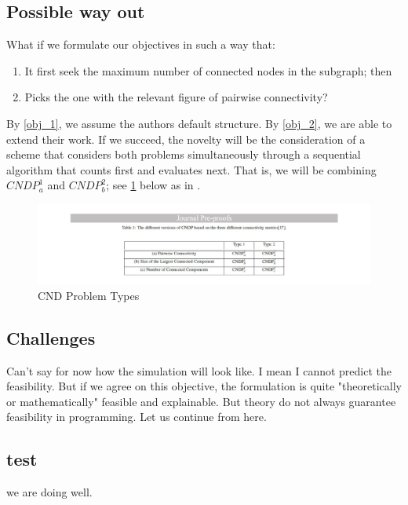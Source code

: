 \subsection{Possible way out}
What if we formulate our objectives in such a way that:
\begin{enumerate}
    \item It first seek the maximum number of connected nodes in the subgraph; then \label{obj_1}
    \item Picks the one with the relevant figure of pairwise connectivity? \label{obj_2}
\end{enumerate}
By \ref{obj_1}, we assume the authors default structure. By \ref{obj_2}, we are able to extend their work.
If we succeed, the novelty will be the consideration of a scheme that considers both problems simultaneously through a sequential algorithm that counts first and evaluates next. That is, we will be combining $CNDP_a^1$ and $CNDP_b^2$; see \ref{fig:cdnp} below as in \cite{rezaei2020eia}.
\begin{figure}[htb!]
    \centering \includegraphics[width=\textwidth]{graphics/cndp.png}
    \caption{CND Problem Types}
    \label{fig:cdnp}
\end{figure}

\subsection{Challenges}
Can't say for now how the simulation will look like. I mean I cannot predict the feasibility. But if we agree on this objective, the formulation is quite "theoretically or mathematically" feasible and explainable. But theory do not always guarantee feasibility in programming. Let us continue from here.

\subsection{test}
we are doing well.